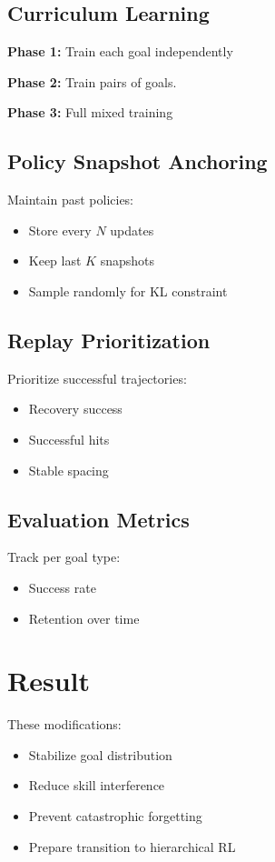 \documentclass[11pt]{article}
\begin{document}
\subsection{Curriculum Learning}

\textbf{Phase 1:}
Train each goal independently

\textbf{Phase 2:}
Train pairs of goals.

\textbf{Phase 3:}
Full mixed training

\subsection{Policy Snapshot Anchoring}
Maintain past policies:
\begin{itemize}[noitemsep]
\item Store every $N$ updates
\item Keep last $K$ snapshots
\item Sample randomly for KL constraint
\end{itemize}

\subsection{Replay Prioritization}
Prioritize successful trajectories:
\begin{itemize}[noitemsep]
\item Recovery success
\item Successful hits
\item Stable spacing
\end{itemize}

\subsection{Evaluation Metrics}
Track per goal type:
\begin{itemize}[noitemsep]
\item Success rate
\item Retention over time
\end{itemize}

\section{Result}

These modifications:
\begin{itemize}[noitemsep]
\item Stabilize goal distribution
\item Reduce skill interference
\item Prevent catastrophic forgetting
\item Prepare transition to hierarchical RL
\end{itemize}
\end{document}
